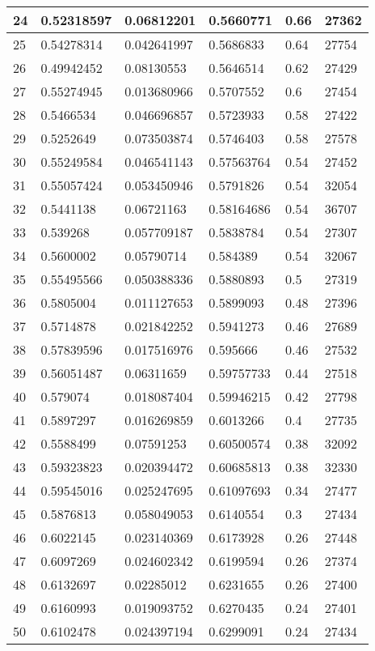 \begin{longtable}{|l|l|l|l|l|l|}
24 & 0.52318597 & 0.06812201 & 0.5660771 & 0.66 & 27362 \\ \hline 
25 & 0.54278314 & 0.042641997 & 0.5686833 & 0.64 & 27754 \\ \hline 
26 & 0.49942452 & 0.08130553 & 0.5646514 & 0.62 & 27429 \\ \hline 
27 & 0.55274945 & 0.013680966 & 0.5707552 & 0.6 & 27454 \\ \hline 
28 & 0.5466534 & 0.046696857 & 0.5723933 & 0.58 & 27422 \\ \hline 
29 & 0.5252649 & 0.073503874 & 0.5746403 & 0.58 & 27578 \\ \hline 
30 & 0.55249584 & 0.046541143 & 0.57563764 & 0.54 & 27452 \\ \hline 
31 & 0.55057424 & 0.053450946 & 0.5791826 & 0.54 & 32054 \\ \hline 
32 & 0.5441138 & 0.06721163 & 0.58164686 & 0.54 & 36707 \\ \hline 
33 & 0.539268 & 0.057709187 & 0.5838784 & 0.54 & 27307 \\ \hline 
34 & 0.5600002 & 0.05790714 & 0.584389 & 0.54 & 32067 \\ \hline 
35 & 0.55495566 & 0.050388336 & 0.5880893 & 0.5 & 27319 \\ \hline 
36 & 0.5805004 & 0.011127653 & 0.5899093 & 0.48 & 27396 \\ \hline 
37 & 0.5714878 & 0.021842252 & 0.5941273 & 0.46 & 27689 \\ \hline 
38 & 0.57839596 & 0.017516976 & 0.595666 & 0.46 & 27532 \\ \hline 
39 & 0.56051487 & 0.06311659 & 0.59757733 & 0.44 & 27518 \\ \hline 
40 & 0.579074 & 0.018087404 & 0.59946215 & 0.42 & 27798 \\ \hline 
41 & 0.5897297 & 0.016269859 & 0.6013266 & 0.4 & 27735 \\ \hline 
42 & 0.5588499 & 0.07591253 & 0.60500574 & 0.38 & 32092 \\ \hline 
43 & 0.59323823 & 0.020394472 & 0.60685813 & 0.38 & 32330 \\ \hline 
44 & 0.59545016 & 0.025247695 & 0.61097693 & 0.34 & 27477 \\ \hline 
45 & 0.5876813 & 0.058049053 & 0.6140554 & 0.3 & 27434 \\ \hline 
46 & 0.6022145 & 0.023140369 & 0.6173928 & 0.26 & 27448 \\ \hline 
47 & 0.6097269 & 0.024602342 & 0.6199594 & 0.26 & 27374 \\ \hline 
48 & 0.6132697 & 0.02285012 & 0.6231655 & 0.26 & 27400 \\ \hline 
49 & 0.6160993 & 0.019093752 & 0.6270435 & 0.24 & 27401 \\ \hline 
50 & 0.6102478 & 0.024397194 & 0.6299091 & 0.24 & 27434 \\ \hline 
\end{longtable}